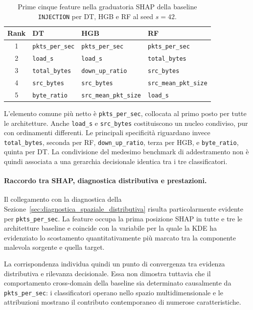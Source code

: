 \begin{table}[H]
    \centering
    \small
    \caption{Prime cinque feature nella graduatoria SHAP della baseline \texttt{INJECTION} per DT, HGB e RF al seed $s=42$.}
    \label{tab:baseline_shap_top5}
    \begin{tabular}{c|lll}
        \toprule
        \textbf{Rank} & \textbf{DT} & \textbf{HGB} & \textbf{RF} \\
        \midrule
        1 & \texttt{pkts\_per\_sec} & \texttt{pkts\_per\_sec} & \texttt{pkts\_per\_sec} \\
        2 & \texttt{load\_s} & \texttt{load\_s} & \texttt{total\_bytes} \\
        3 & \texttt{total\_bytes} & \texttt{down\_up\_ratio} & \texttt{src\_bytes} \\
        4 & \texttt{src\_bytes} & \texttt{src\_bytes} & \texttt{src\_mean\_pkt\_size} \\
        5 & \texttt{byte\_ratio} & \texttt{src\_mean\_pkt\_size} & \texttt{load\_s} \\
        \bottomrule
    \end{tabular}
\end{table}

L'elemento comune più netto è \texttt{pkts\_per\_sec}, collocata al primo posto per tutte le architetture. 
Anche \texttt{load\_s} e \texttt{src\_bytes} costituiscono un nucleo condiviso, pur con ordinamenti differenti. 
Le principali specificità riguardano invece \texttt{total\_bytes}, seconda per RF, \texttt{down\_up\_ratio}, terza per HGB, e \texttt{byte\_ratio}, quinta per DT. 
La condivisione del medesimo benchmark di addestramento non è quindi associata a una gerarchia decisionale identica tra i tre classificatori.

\paragraph{Raccordo tra SHAP, diagnostica distributiva e prestazioni.}
Il collegamento con la diagnostica della Sezione~\ref{sec:diagnostica_spaziale_distributiva} risulta particolarmente evidente per \texttt{pkts\_per\_sec}. 
La feature occupa la prima posizione SHAP in tutte e tre le architetture baseline e coincide con la variabile per la quale la KDE ha evidenziato lo scostamento quantitativamente più marcato tra la componente malevola sorgente e quella target.

La corrispondenza individua quindi un punto di convergenza tra evidenza distributiva e rilevanza decisionale. 
Essa non dimostra tuttavia che il comportamento cross-domain della baseline sia determinato causalmente da \texttt{pkts\_per\_sec}: i classificatori operano nello spazio multidimensionale e le attribuzioni mostrano il contributo contemporaneo di numerose caratteristiche.

